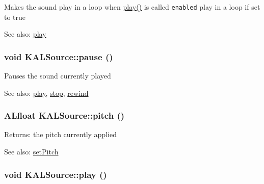 Makes the sound play in a loop when \hyperlink{class_k_a_l_source_22573a4415c721d03693519b6ea0af96}{play()} is called {\tt enabled} play in a loop if set to true \begin{Desc}
\item[See also:]\hyperlink{class_k_a_l_source_22573a4415c721d03693519b6ea0af96}{play} \end{Desc}
\hypertarget{class_k_a_l_source_5073e178991fd50af8344a7e64491634}{
\subsubsection[{pause}]{\setlength{\rightskip}{0pt plus 5cm}void KALSource::pause ()}}
\label{class_k_a_l_source_5073e178991fd50af8344a7e64491634}


Pauses the sound currently played \begin{Desc}
\item[See also:]\hyperlink{class_k_a_l_source_22573a4415c721d03693519b6ea0af96}{play}, \hyperlink{class_k_a_l_source_1796d7faf1bb7614111b3d7477c7c42b}{stop}, \hyperlink{class_k_a_l_source_9c8b97bd784c3c362fd65276b9df03b4}{rewind} \end{Desc}
\hypertarget{class_k_a_l_source_c3ed83870c78752ad17090840f54b6ab}{
\subsubsection[{pitch}]{\setlength{\rightskip}{0pt plus 5cm}ALfloat KALSource::pitch ()}}
\label{class_k_a_l_source_c3ed83870c78752ad17090840f54b6ab}


\begin{Desc}
\item[Returns:]the pitch currently applied \end{Desc}
\begin{Desc}
\item[See also:]\hyperlink{class_k_a_l_source_052f5b82f78a130af322334e2a340d0a}{setPitch} \end{Desc}
\hypertarget{class_k_a_l_source_22573a4415c721d03693519b6ea0af96}{
\subsubsection[{play}]{\setlength{\rightskip}{0pt plus 5cm}void KALSource::play ()}}
\label{class_k_a_l_source_22573a4415c721d03693519b6ea0af96}


